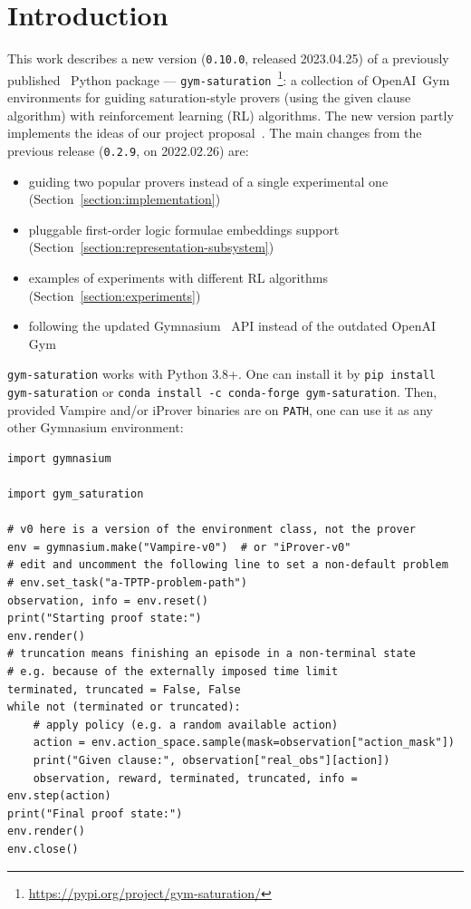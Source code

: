 \documentclass[runningheads]{llncs}
\begin{document}
\section{Introduction}
This work describes a new version (\texttt{0.10.0}, released 2023.04.25) of a previously published~\cite{Shminke2022} Python package --- \texttt{gym-saturation}~\footnote{\url{https://pypi.org/project/gym-saturation/}}: a collection of OpenAI~Gym~\cite{DBLP:journals/corr/BrockmanCPSSTZ16} environments for guiding saturation-style provers (using the given clause algorithm) with reinforcement learning (RL) algorithms. The new version partly implements the ideas of our project proposal~\cite{https://doi.org/10.48550/arxiv.2209.02562}. The main changes from the previous release (\texttt{0.2.9}, on 2022.02.26) are:
\begin{itemize}
\item guiding two popular provers instead of a single experimental one (Section~\ref{section:implementation})
\item pluggable first-order logic formulae embeddings support (Section~\ref{section:representation-subsystem})
\item examples of experiments with different RL algorithms (Section~\ref{section:experiments})
\item following the updated Gymnasium~\cite{towers_gymnasium_2023} API instead of the outdated OpenAI Gym
\end{itemize}

\texttt{gym-saturation} works with Python 3.8+. One can install it by \texttt{pip install gym-saturation} or \texttt{conda install -c conda-forge gym-saturation}. Then, provided Vampire and/or iProver binaries are on \texttt{PATH}, one can use it as any other Gymnasium environment:
\begin{verbatim}
import gymnasium

import gym_saturation

# v0 here is a version of the environment class, not the prover
env = gymnasium.make("Vampire-v0")  # or "iProver-v0"
# edit and uncomment the following line to set a non-default problem
# env.set_task("a-TPTP-problem-path")
observation, info = env.reset()
print("Starting proof state:")
env.render()
# truncation means finishing an episode in a non-terminal state
# e.g. because of the externally imposed time limit
terminated, truncated = False, False
while not (terminated or truncated):
    # apply policy (e.g. a random available action)
    action = env.action_space.sample(mask=observation["action_mask"])
    print("Given clause:", observation["real_obs"][action])
    observation, reward, terminated, truncated, info = env.step(action)
print("Final proof state:")
env.render()
env.close()
\end{verbatim}                   
\end{document}

